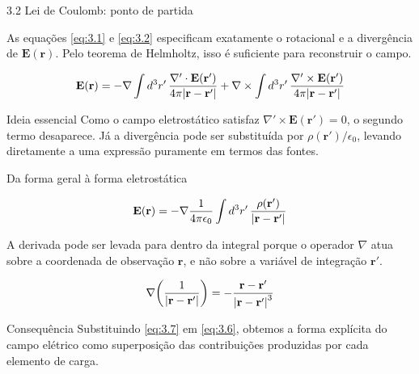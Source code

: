 \documentclass[aspectratio=169,11pt]{beamer}
\newcommand{\E}{\mathbf{E}}
\newcommand{\rr}{\mathbf{r}}
\begin{document}
\begin{frame}{3.2 Lei de Coulomb: ponto de partida}
\begin{mybox}
\justifying
As equações \eqref{eq:3.1} e \eqref{eq:3.2} especificam exatamente o rotacional e a divergência de \(\E(\rr)\). 
Pelo teorema de Helmholtz, isso é suficiente para reconstruir o campo.
\end{mybox}

\vspace{0.25cm}

\begin{eqbox}
\begin{equation}
\E(\rr)=
-\nabla \int d^3r'\,\frac{\nabla'\cdot \E(\rr')}{4\pi\abs{\rr-\rr'}}
+
\nabla\times \int d^3r'\,\frac{\nabla'\times \E(\rr')}{4\pi\abs{\rr-\rr'}}
\label{eq:3.5}
\end{equation}
\end{eqbox}

\vspace{0.2cm}

\begin{block}{Ideia essencial}
\justifying
Como o campo eletrostático satisfaz \(\nabla'\times\E(\rr')=0\), o segundo termo desaparece.
Já a divergência pode ser substituída por \(\rho(\rr')/\epsilon_0\), levando diretamente a uma expressão puramente em termos das fontes.
\end{block}
\end{frame}

\begin{frame}{Da forma geral à forma eletrostática}
\begin{eqbox}
\begin{equation}
\E(\rr)=
-\nabla \frac{1}{4\pi\epsilon_0}\int d^3r'\,\frac{\rho(\rr')}{\abs{\rr-\rr'}}
\label{eq:3.6}
\end{equation}
\end{eqbox}


\begin{mybox}
\justifying
A derivada pode ser levada para dentro da integral porque o operador \(\nabla\) atua sobre a coordenada de observação \(\rr\), e não sobre a variável de integração \(\rr'\).
\end{mybox}


\begin{eqbox}
\begin{equation}
\nabla\!\left(\frac{1}{\abs{\rr-\rr'}}\right)
=
-\frac{\rr-\rr'}{\abs{\rr-\rr'}^3}
\label{eq:3.7}
\end{equation}
\end{eqbox}


\begin{block}{Consequência}
Substituindo \eqref{eq:3.7} em \eqref{eq:3.6}, obtemos a forma explícita do campo elétrico como superposição das contribuições produzidas por cada elemento de carga.
\end{block}
\end{frame}
\end{document}
